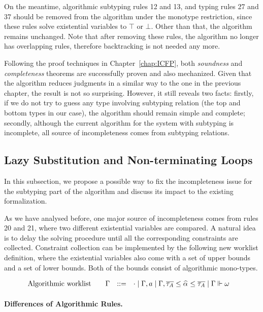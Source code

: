 On the meantime, algorithmic subtyping rules 12 and 13, and typing rules 27 and 37
should be removed from the algorithm under the monotype restriction,
since these rules solve existential variables to $\top$ or $\bot$.
Other than that, the algorithm remains unchanged.
Note that after removing these rules,
the algorithm no longer has overlapping rules,
therefore backtracking is not needed any more.

Following the proof techniques in Chapter~\ref{chap:ICFP},
both \emph{soundness} and \emph{completeness} theorems
are successfully proven and also mechanized.
Given that the algorithm reduces judgments in a similar way to the one in the previous chapter,
the result is not so surprising.
However, it still reveals two facts:
firstly, if we do not try to guess any type involving subtyping relation
(the top and bottom types in our case),
the algorithm should remain simple and complete;
secondly, although the current algorithm for the system with subtyping is incomplete,
all source of incompleteness comes from subtyping relations.

\subsection{Lazy Substitution and Non-terminating Loops}\label{subsec:lazy_subst}
In this subsection, we propose a possible way to fix the incompleteness issue
for the subtyping part of the algorithm and discuss its impact to the existing formalization.

As we have analysed before,
one major source of incompleteness comes from rules 20 and 21,
where two different existential variables are compared.
A natural idea is to delay the solving procedure until all the corresponding
constraints are collected.
Constraint collection can be implemented by the following new worklist definition,
where the existential variables also come with a set of upper bounds
and a set of lower bounds. Both of the bounds consist of algorithmic mono-types.

\begin{gather*}
    \begin{aligned}
        \text{Algorithmic worklist}\qquad&\Gm &::=&\quad \cdot \mid \Gm, a \mid \Gm, \overline{\tau_A} \le \al \le \overline{\tau_A} \mid \Gm \Vdash \jg
    \end{aligned}
\end{gather*}

\paragraph{Differences of Algorithmic Rules.}

